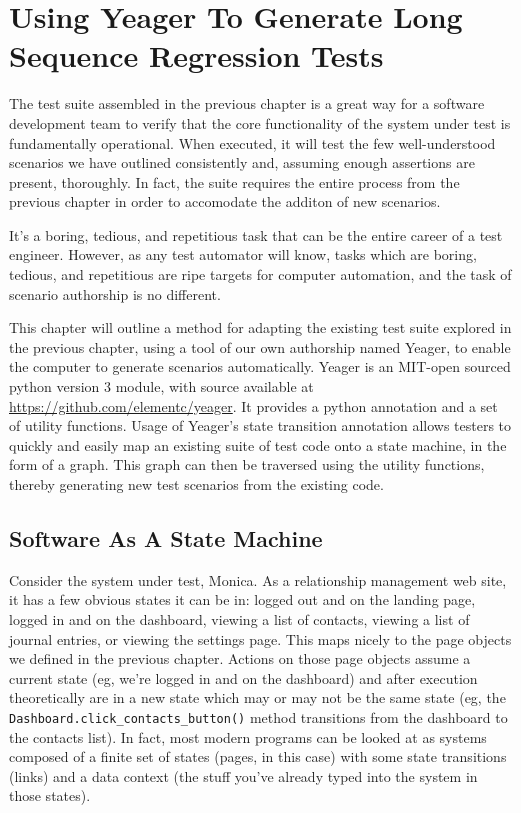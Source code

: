 \chapter{Using Yeager To Generate Long Sequence Regression Tests}
The test suite assembled in the previous chapter is a great way for a software development team to verify that the core functionality of the system under test is fundamentally operational. When executed, it will test the few well-understood scenarios we have outlined consistently and, assuming enough assertions are present, thoroughly. In fact, the suite requires the entire process from the previous chapter in order to accomodate the additon of new scenarios.

It's a boring, tedious, and repetitious task that can be the entire career of a test engineer. However, as any test automator will know, tasks which are boring, tedious, and repetitious are ripe targets for computer automation, and the task of scenario authorship is no different.

This chapter will outline a method for adapting the existing test suite explored in the previous chapter, using a tool of our own authorship named Yeager, to enable the computer to generate scenarios automatically. Yeager is an MIT-open sourced python version 3 module, with source available at \url{https://github.com/elementc/yeager}. It provides a python annotation and a set of utility functions. Usage of Yeager's state transition annotation allows testers to quickly and easily map an existing suite of test code onto a state machine, in the form of a graph. This graph can then be traversed using the utility functions, thereby generating new test scenarios from the existing code.

\section{Software As A State Machine}
Consider the system under test, Monica. As a relationship management web site, it has a few obvious states it can be in: logged out and on the landing page, logged in and on the dashboard, viewing a list of contacts, viewing a list of journal entries, or viewing the settings page. This maps nicely to the page objects we defined in the previous chapter. Actions on those page objects assume a current state (eg, we're logged in and on the dashboard) and after execution theoretically are in a new state which may or may not be the same state (eg, the \texttt{Dashboard.click\_contacts\_button()} method transitions from the dashboard to the contacts list). In fact, most modern programs can be looked at as systems composed of a finite set of states (pages, in this case) with some state transitions (links) and a data context (the stuff you've already typed into the system in those states).

